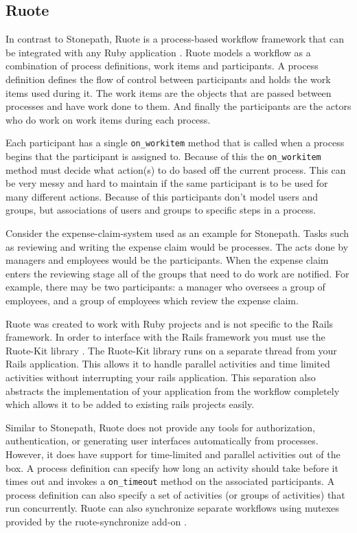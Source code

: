 \documentclass[document.tex]{subfiles}
\begin{document}
\FloatBarrier

\subsection {Ruote}

In contrast to Stonepath, Ruote is a process-based workflow framework that can be integrated with any Ruby application \cite{ruote}. Ruote models a workflow as a combination of process definitions, work items and participants. A process definition defines the flow of control between participants and holds the work items used during it. The work items are the objects that are passed between processes and have work done to them. And finally the participants are the actors who do work on work items during each process. 

Each participant has a single \verb!on_workitem! method that is called when a process begins that the participant is assigned to. Because of this the \verb!on_workitem! method must decide what action(s) to do based off the current process. This can be very messy and hard to maintain if the same participant is to be used for many different actions. Because of this participants don't model users and groups, but associations of users and groups to specific steps in a process.

Consider the expense-claim-system used as an example for Stonepath. Tasks such as reviewing and writing the expense claim would be processes. The acts done by managers and employees would be the participants. When the expense claim enters the reviewing stage all of the groups that need to do work are notified. For example, there may be two participants: a manager who oversees a group of employees, and a group of employees which review the expense claim.

Ruote was created to work with Ruby projects and is not specific to the Rails framework. In order to interface with the Rails framework you must use the Ruote-Kit library \cite{ruote-kit}. The Ruote-Kit library runs on a separate thread from your Rails application. This allows it to handle parallel activities and time limited activities without interrupting your rails application. This separation also abstracts the implementation of your application from the workflow completely which allows it to be added to existing rails projects easily.

Similar to Stonepath, Ruote does not provide any tools for authorization, authentication, or generating user interfaces automatically from processes. However, it does have support for time-limited and parallel activities out of the box. A process definition can specify how long an activity should take before it times out and invokes a \verb!on_timeout! method on the associated participants. A process definition can also specify a set of activities (or groups of activities) that run concurrently. Ruote can also synchronize separate workflows using mutexes provided by the ruote-synchronize add-on \cite{ruote-synchronize}.
\end{document}
